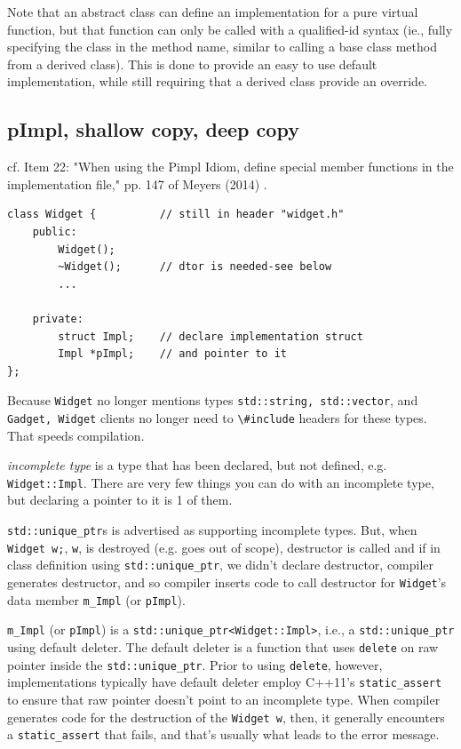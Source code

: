 \documentclass[10pt]{amsart}
\begin{document}
\begin{multicols*}{2}
Note that an abstract class can define an implementation for a pure virtual function, but that function can only be called with a qualified-id syntax (ie., fully specifying the class in the method name, similar to calling a base class method from a derived class). This is done to provide an easy to use default implementation, while still requiring that a derived class provide an override.

\subsection{pImpl, shallow copy, deep copy}  

cf. Item 22: "When using the Pimpl Idiom, define special member functions in the implementation file," pp. 147 of Meyers (2014) \cite{ScMe2014}.  

\begin{lstlisting}
class Widget { 			// still in header "widget.h" 
	public:
		Widget();
		~Widget();		// dtor is needed-see below 
		... 
	
	private:
		struct Impl;	// declare implementation struct 
		Impl *pImpl;	// and pointer to it
};
\end{lstlisting}

Because \verb|Widget| no longer mentions types \verb|std::string, std::vector|, and \verb|Gadget, Widget| clients no longer need to \verb|\#include| headers for these types.  That speeds compilation.  

\emph{incomplete type} is a type that has been declared, but not defined, e.g. \verb|Widget::Impl|.  There are very few things you can do with an incomplete type, but declaring a pointer to it is 1 of them.  

\verb|std::unique_ptr|s is advertised as supporting incomplete types.  But, when \verb|Widget w;|, \verb|w|, is destroyed (e.g. goes out of scope), destructor is called and if in class definition using \verb|std::unique_ptr|, we didn't declare destructor, compiler generates destructor, and so compiler inserts code to call destructor for \verb|Widget|'s data member \verb|m_Impl| (or \verb|pImpl|).  

\verb|m_Impl| (or \verb|pImpl|) is a \verb|std::unique_ptr<Widget::Impl>|, i.e., a \verb|std::unique_ptr| using default deleter. The default deleter is a function that uses \verb|delete| on raw pointer inside the \verb|std::unique_ptr|.  Prior to using \verb|delete|, however, implementations typically have default deleter employ C++11's \verb|static_assert| to ensure that raw pointer doesn't point to an incomplete type.  When compiler generates code for the destruction of the \verb|Widget w|, then, it generally encounters a \verb|static_assert| that fails, and that's usually what leads to the error message.  


\end{multicols*}
\end{document}
